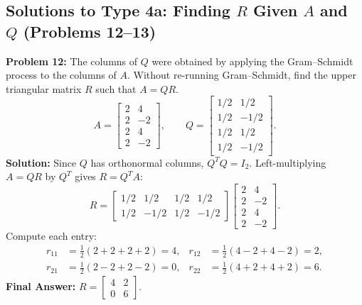 \documentclass[11pt, letterpaper]{article}
\theoremstyle{definition}
\theoremstyle{remark}
\begin{document}
\subsection{Solutions to Type 4a: Finding $R$ Given $A$ and $Q$ (Problems 12--13)}

\textbf{Problem 12:} The columns of $Q$ were obtained by applying the Gram--Schmidt process to the columns of $A$. Without re-running Gram--Schmidt, find the upper triangular matrix $R$ such that $A = QR$.
\[
    A = \begin{bmatrix}
        2 & 4 \\
        2 & -2 \\
        2 & 4 \\
        2 & -2
    \end{bmatrix}, \qquad
    Q = \begin{bmatrix}
        1/2 & 1/2 \\
        1/2 & -1/2 \\
        1/2 & 1/2 \\
        1/2 & -1/2
    \end{bmatrix}.
\]
\textbf{Solution:} Since $Q$ has orthonormal columns, $Q^T Q = I_2$. Left-multiplying $A = QR$ by $Q^T$ gives $R = Q^T A$:
\[
    R = \begin{bmatrix}
        1/2 & 1/2 & 1/2 & 1/2 \\
        1/2 & -1/2 & 1/2 & -1/2
    \end{bmatrix}
    \begin{bmatrix}
        2 & 4 \\
        2 & -2 \\
        2 & 4 \\
        2 & -2
    \end{bmatrix}.
\]
Compute each entry:
\begin{align*}
    r_{11} &= \frac{1}{2}(2 + 2 + 2 + 2) = 4, & r_{12} &= \frac{1}{2}(4 - 2 + 4 - 2) = 2, \\
    r_{21} &= \frac{1}{2}(2 - 2 + 2 - 2) = 0, & r_{22} &= \frac{1}{2}(4 + 2 + 4 + 2) = 6.
\end{align*}
\textbf{Final Answer:} $R = \begin{bmatrix} 4 & 2 \\ 0 & 6 \end{bmatrix}$.

\vspace{0.8em}
\end{document}
